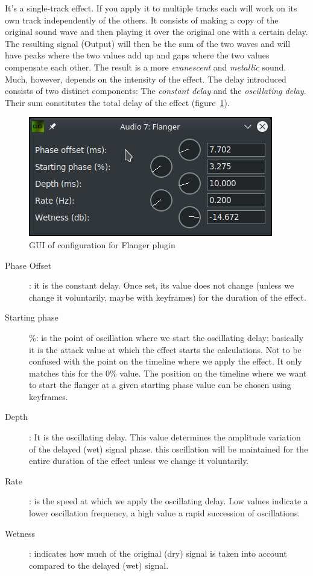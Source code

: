 It's a single-track effect. If you apply it to multiple tracks each will work on its own track independently of the others.
It consists of making a copy of the original sound wave and then playing it over the original one with a certain delay. The resulting signal (Output) will then be the sum of the two waves and will have peaks where the two values add up and gaps where the two values compensate each other. The result is a more \textit{evanescent} and \textit{metallic} sound. Much, however, depends on the intensity of the effect.
The delay introduced consists of two distinct components: The \textit{constant delay} and the \textit{oscillating delay}. Their sum constitutes the total delay of the effect (figure~\ref{fig:flanger}).

\begin{figure}[htpb]
	\centering
	\includegraphics[width=0.5\linewidth]{images/flanger.png}
	\caption{GUI of configuration for Flanger plugin}
	\label{fig:flanger}
\end{figure}

\begin{description}
	\item[Phase Offset]: it is the constant delay. Once set, its value does not change (unless we change it voluntarily, maybe with keyframes) for the duration of the effect.
	\item[Starting phase] \%: is the point of oscillation where we start the oscillating delay; basically it is the attack value at which the effect starts the calculations. Not to be confused with the point on the timeline where we apply the effect. It only matches this for the 0\% value. The position on the timeline where we want to start the flanger at a given starting phase value can be chosen using keyframes.
	\item[Depth]: It is the oscillating delay. This value determines the amplitude variation of the delayed (wet) signal phase. this oscillation will be maintained for the entire duration of the effect unless we change it voluntarily.
	\item[Rate]: is the speed at which we apply the oscillating delay. Low values indicate a lower oscillation frequency, a high value a rapid succession of oscillations.
	\item[Wetness]: indicates how much of the original (dry) signal is taken into account compared to the delayed (wet) signal.
\end{description}

